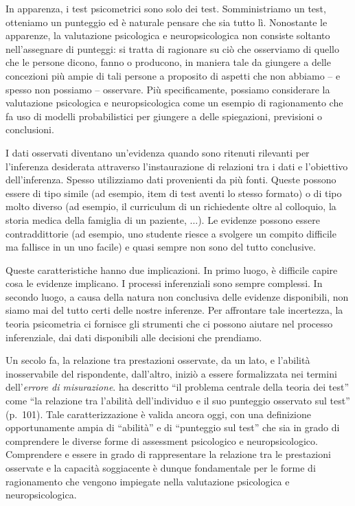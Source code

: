 \documentclass[
  11pt,
]{krantz}
\theoremstyle{definition}
\theoremstyle{definition}
\theoremstyle{definition}
\theoremstyle{definition}
\theoremstyle{remark}
\begin{document}
In apparenza, i test psicometrici sono solo dei test. Somministriamo un test, otteniamo un punteggio ed è naturale pensare che sia tutto lì. Nonostante le apparenze, la valutazione psicologica e neuropsicologica non consiste soltanto nell'assegnare di punteggi: si tratta di ragionare su ciò che osserviamo di quello che le persone dicono, fanno o producono, in maniera tale da giungere a delle concezioni più ampie di tali persone a proposito di aspetti che non abbiamo -- e spesso non possiamo -- osservare. Più specificamente, possiamo considerare la valutazione psicologica e neuropsicologica come un esempio di ragionamento che fa uso di modelli probabilistici per giungere a delle spiegazioni, previsioni o conclusioni.

I dati osservati diventano un'evidenza quando sono ritenuti rilevanti per l'inferenza desiderata attraverso l'instaurazione di relazioni tra i dati e l'obiettivo dell'inferenza. Spesso utilizziamo dati provenienti da più fonti. Queste possono essere di tipo simile (ad esempio, item di test aventi lo stesso formato) o di tipo molto diverso (ad esempio, il curriculum di un richiedente oltre al colloquio, la storia medica della famiglia di un paziente, \(\dots\)). Le evidenze possono essere contraddittorie (ad esempio, uno studente riesce a svolgere un compito difficile ma fallisce in un uno facile) e quasi sempre non sono del tutto conclusive.

Queste caratteristiche hanno due implicazioni. In primo luogo, è difficile capire cosa le evidenze implicano. I processi inferenziali sono sempre complessi. In secondo luogo, a causa della natura non conclusiva delle evidenze disponibili, non siamo mai del tutto certi delle nostre inferenze. Per affrontare tale incertezza, la teoria psicometria ci fornisce gli strumenti che ci possono aiutare nel processo inferenziale, dai dati disponibili alle decisioni che prendiamo.

Un secolo fa, la relazione tra prestazioni osservate, da un lato, e l'abilità inosservabile del rispondente, dall'altro, iniziò a essere formalizzata nei termini dell'\emph{errore di misurazione}. \citet{gulliksen1961measurement} ha descritto ``il problema centrale della teoria dei test'' come ``la relazione tra l'abilità dell'individuo e il suo punteggio osservato sul test'' (p.~101). Tale caratterizzazione è valida ancora oggi, con una definizione opportunamente ampia di ``abilità'' e di ``punteggio sul test'' che sia in grado di comprendere le diverse forme di assessment psicologico e neuropsicologico. Comprendere e essere in grado di rappresentare la relazione tra le prestazioni osservate e la capacità soggiacente è dunque fondamentale per le forme di ragionamento che vengono impiegate nella valutazione psicologica e neuropsicologica.
\end{document}

